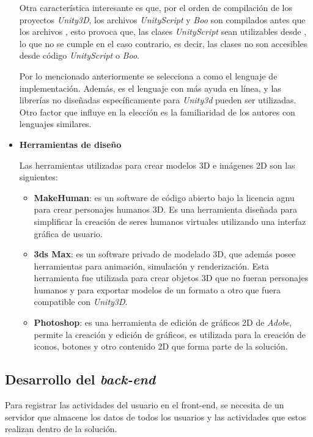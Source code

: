 \begin{itemize}
Otra característica interesante es que, por el orden de compilación de los
proyectos \textit{Unity3D}, los archivos \textit{UnityScript} y \textit{Boo} son
compilados antes que los archivos \cs{}, esto provoca que, las clases
\textit{UnityScript} sean utilizables desde \cs{}, lo que no se cumple en el
caso contrario, es decir, las clases \cs{} no son accesibles desde código
\textit{UnityScript} o \textit{Boo}.

Por lo mencionado anteriormente se selecciona a \cs{} como el lenguaje de
implementación. Además, es el lenguaje con más ayuda en línea, y las
librerías no diseñadas específicamente para \textit{Unity3d} pueden ser
utilizadas. Otro factor que influye en la elección es la familiaridad de los
autores con lenguajes similares. 

\item \textbf{Herramientas de diseño}

Las herramientas utilizadas para crear modelos 3D e imágenes 2D son las siguientes:

\begin{itemize}
\item \textbf{MakeHuman}: es un software de código abierto bajo la licencia
    \Gls{agnu} para crear personajes humanos 3D. Es una herramienta diseñada
    para simplificar la creación de seres humanos virtuales utilizando una
    interfaz gráfica de usuario\cite{makehuman}. 
\item \textbf{3ds Max}: es un software privado de modelado 3D, que además posee
    herramientas para animación, simulación y renderización. Esta herramienta
    fue utilizada para crear objetos 3D que no fueran personajes humanos y para
    exportar modelos de un formato a otro que fuera compatible con
    \textit{Unity3D}\cite{3dsmax}.
\item \textbf{Photoshop}: es una herramienta de edición de gráficos 2D de
    \textit{Adobe}, permite la creación y edición de gráficos, es utilizada para
    la creación de iconos, botones y otro contenido 2D que forma parte de la
    solución.
\end{itemize}

\end{itemize}


\subsection{Desarrollo del \textit{back-end}}

Para registrar las actividades del usuario en el front-end, se necesita de un servidor que
almacene los datos de todos los usuarios y las actividades que estos realizan
dentro de la solución.

